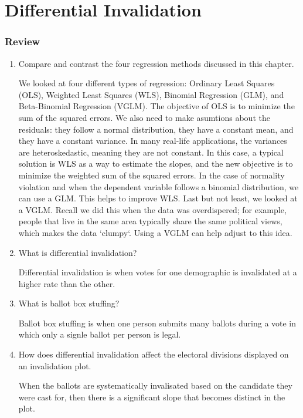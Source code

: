 \chapter{Differential Invalidation}\label{ch:regression} 


\subsection*{Review}
\begin{enumerate}

 \item Compare and contrast the four regression methods discussed in this chapter.
\begin{solution}
We looked at four different types of regression: Ordinary Least Squares (OLS), Weighted Least Squares (WLS), Binomial Regression (GLM), and Beta-Binomial Regression (VGLM). The objective of OLS is to minimize the sum of the squared errors. We also need to make asumtions about the residuals: they follow a normal distribution, they have a constant mean, and they have a constant variance. In many real-life applications, the variances are heteroskedastic, meaning they are not constant. In this case, a typical solution is WLS as a way to estimate the slopes, and the new objective is to minimize the weighted sum of the squared errors. In the case of normality violation and when the dependent variable follows a binomial distribution, we can use a GLM. This helps to improve WLS. Last but not least, we looked at a VGLM. Recall we did this when the data was overdispered; for example, people that live in the same area typically share the same political views, which makes the data `clumpy`. Using a VGLM can help adjust to this idea. 
\end{solution}
 
 \item What is differential invalidation?
\begin{solution}
Differential invalidation is when votes for one demographic is invalidated at a higher rate than the other.
\end{solution}
 
 \item What is ballot box stuffing?
\begin{solution}
Ballot box stuffing is when one person submits many ballots during a vote in which only a signle ballot per person is legal.
\end{solution}
 
 \item How does differential invalidation affect the electoral divisions displayed on an invalidation plot.
\begin{solution}
When the ballots are systematically invalisated based on the candidate they were cast for, then there is a significant slope that becomes distinct in the plot. 
\end{solution}
 

\end{enumerate}
